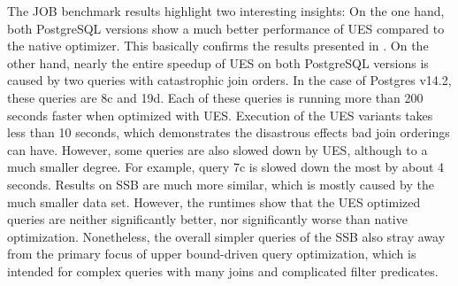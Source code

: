 

The JOB benchmark results highlight two interesting insights: On the one hand, both PostgreSQL versions show a much better performance of UES compared to the native optimizer.
This basically confirms the results presented in \cite{hertzschuch-21-ues}.
On the other hand, nearly the entire speedup of UES on both PostgreSQL versions is caused by two queries with catastrophic join orders. In the case of Postgres v14.2, these queries are  8c and 19d. Each of these queries is running more than 200 seconds faster when optimized with UES. Execution of the UES variants takes less than 10 seconds, which demonstrates the disastrous effects bad join orderings can have. However, some queries are also slowed down by UES, although to a much smaller degree. For example, query 7c is slowed down the most by about 4 seconds.
Results on SSB are much more similar, which is mostly caused by the much smaller data set. However, the runtimes show that the UES optimized queries are neither significantly better, nor significantly worse than native optimization.
Nonetheless, the overall simpler queries of the SSB also stray away from the primary focus of upper bound-driven query optimization, which is intended for complex queries with many joins and complicated filter predicates.

